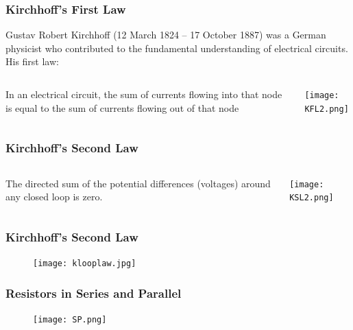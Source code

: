 \documentclass{beamer}
\begin{document}
\begin{frame}
\frametitle{Kirchhoff's First Law}
Gustav Robert Kirchhoff (12 March 1824 – 17 October 1887) was a German physicist who contributed to the fundamental understanding of electrical circuits. His first law:
\begin{columns}
\begin{column}{5cm}
In an electrical circuit, the sum of currents flowing into that node is equal to the sum of currents flowing out of that node
\end{column}
\begin{column}{4cm}
\begin{overprint}
\texttt{[image: KFL2.png]}
\end{overprint}
\end{column}
\end{columns}
\end{frame}

\begin{frame}
\frametitle{Kirchhoff's Second Law}
\begin{columns}
\begin{column}{4cm}
The directed sum of the potential differences (voltages) around any closed loop is zero.
\end{column}
\begin{column}{6cm}
\begin{overprint}
\texttt{[image: KSL2.png]}
\end{overprint}
\end{column}
\end{columns}
\end{frame}

\begin{frame}
\frametitle{Kirchhoff's Second Law}
\begin{figure}
\texttt{[image: klooplaw.jpg]} 
\end{figure}
\end{frame}


\begin{frame}
\frametitle{Resistors in Series and Parallel}
\begin{figure}
\texttt{[image: SP.png]} 
\end{figure}
\end{frame}
\end{document}
